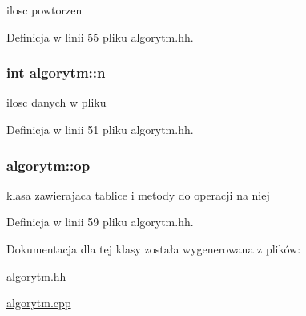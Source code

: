 ilosc powtorzen 



\-Definicja w linii 55 pliku algorytm.\-hh.

\hypertarget{classalgorytm_a2778c37f0ec06a30b7d494501c40e91a}{
\subsubsection[{n}]{\setlength{\rightskip}{0pt plus 5cm}int {\bf algorytm\-::n}}}\label{classalgorytm_a2778c37f0ec06a30b7d494501c40e91a}


ilosc danych w pliku 



\-Definicja w linii 51 pliku algorytm.\-hh.

\hypertarget{classalgorytm_aedaee1aa41206b5f050fe660d0846f2d}{
\subsubsection[{op}]{ {\bf algorytm\-::op}}}\label{classalgorytm_aedaee1aa41206b5f050fe660d0846f2d}


klasa zawierajaca tablice i metody do operacji na niej 



\-Definicja w linii 59 pliku algorytm.\-hh.



\-Dokumentacja dla tej klasy została wygenerowana z plików\-:\begin{DoxyCompactItemize}
\item 
\hyperlink{algorytm_8hh}{algorytm.\-hh}\item 
\hyperlink{algorytm_8cpp}{algorytm.\-cpp}\end{DoxyCompactItemize}
